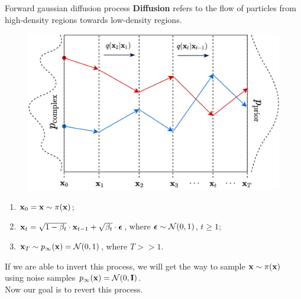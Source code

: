 \begin{frame}{Forward gaussian diffusion process}
	\textbf{Diffusion} refers to the flow of particles from high-density regions towards low-density regions.
	\vspace{-0.2cm}
	\begin{figure}
		\includegraphics[width=0.5\linewidth]{figs/diffusion_over_time}
	\end{figure}
	\vspace{-0.6cm}
	\begin{enumerate}
		\item $\mathbf{x}_0 = \mathbf{x} \sim \pi(\mathbf{x})$;
		\item $\mathbf{x}_t = \sqrt{1 - \beta_t} \cdot \mathbf{x}_{t - 1} + \sqrt{\beta_t} \cdot \boldsymbol{\epsilon}$, where $\boldsymbol{\epsilon} \sim \mathcal{N}(0, 1)$, $t \geq 1$;
		\item $\mathbf{x}_T \sim p_{\infty}(\mathbf{x}) = \mathcal{N}(0, 1)$, where $T >> 1$.
	\end{enumerate}
	If we are able to invert this process, we will get the way to sample $\mathbf{x} \sim \pi(\mathbf{x})$ using noise samples $p_{\infty}(\mathbf{x}) = \mathcal{N}(0, \mathbf{I})$. \\ 
	Now our goal is to revert this process.
\end{frame}
